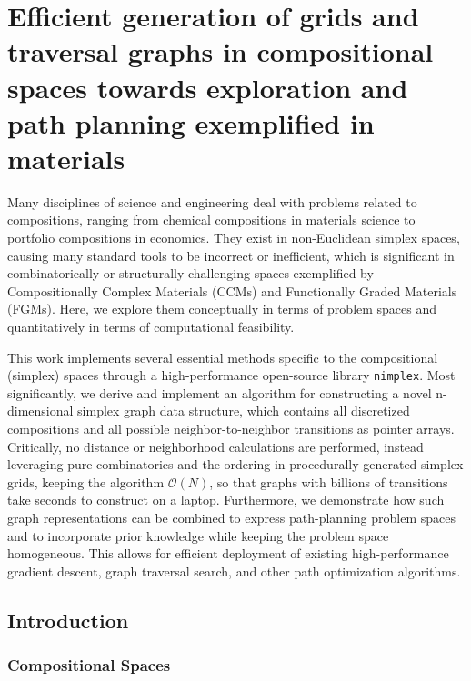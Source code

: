 \chapter{Efficient generation of grids and traversal graphs in compositional spaces towards exploration and path planning exemplified in materials} \label{chap:nimplex}


Many disciplines of science and engineering deal with problems related to compositions, ranging from chemical compositions in materials science to portfolio compositions in economics. They exist in non-Euclidean simplex spaces, causing many standard tools to be incorrect or inefficient, which is significant in combinatorically or structurally challenging spaces exemplified by Compositionally Complex Materials (CCMs) and Functionally Graded Materials (FGMs). Here, we explore them conceptually in terms of problem spaces and quantitatively in terms of computational feasibility.

This work implements several essential methods specific to the compositional (simplex) spaces through a high-performance open-source library \texttt{nimplex}. Most significantly, we derive and implement an algorithm for constructing a novel n-dimensional simplex graph data structure, which contains all discretized compositions and all possible neighbor-to-neighbor transitions as pointer arrays. Critically, no distance or neighborhood calculations are performed, instead leveraging pure combinatorics and the ordering in procedurally generated simplex grids, keeping the algorithm $\mathcal{O}(N)$, so that graphs with billions of transitions take seconds to construct on a laptop. Furthermore, we demonstrate how such graph representations can be combined to express path-planning problem spaces and to incorporate prior knowledge while keeping the problem space homogeneous. This allows for efficient deployment of existing high-performance gradient descent, graph traversal search, and other path optimization algorithms.

\section{Introduction} \label{nimplex:sec:introduction}

\subsection{Compositional Spaces} \label{nimplex:ssec:compositionalspaces}

